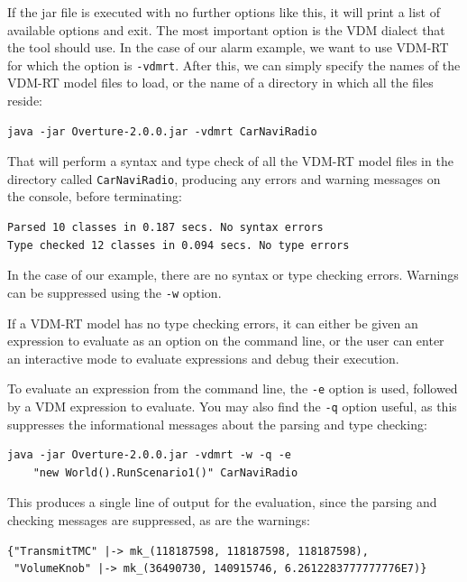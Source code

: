 \noindent If the jar file is executed with no further options like this, it will
print a list of available options and exit. The most important option is the VDM
dialect that the tool should use. In the case of our alarm example, we want to
use VDM-RT for which the option is \verb|-vdmrt|. After this, we can simply
specify the names of the VDM-RT model files to load, or the name of a directory
in which all the files reside:

\begin{lstlisting}
java -jar Overture-2.0.0.jar -vdmrt CarNaviRadio
\end{lstlisting}

\noindent That will perform a syntax and type check of all the VDM-RT model
files in the directory called \verb|CarNaviRadio|, producing any errors and warning
messages on the console, before terminating:

\begin{lstlisting}
Parsed 10 classes in 0.187 secs. No syntax errors
Type checked 12 classes in 0.094 secs. No type errors
\end{lstlisting}

\noindent In the case of our example, there are no syntax or type checking
errors. Warnings can be suppressed using the \verb|-w| option.

If a VDM-RT model has no type checking errors, it can either be given an
expression to evaluate as an option on the command line, or the user can enter
an interactive mode to evaluate expressions and debug their execution.

To evaluate an expression from the command line, the \verb|-e| option is used,
followed by a VDM expression to evaluate. You may also find the \verb|-q|
option useful, as this suppresses the informational messages about the parsing
and type checking:

\begin{lstlisting}
java -jar Overture-2.0.0.jar -vdmrt -w -q -e 
    "new World().RunScenario1()" CarNaviRadio
\end{lstlisting}

\noindent This produces a single line of output for the evaluation, since the
parsing and checking messages are suppressed, as are the warnings:

\begin{lstlisting}
{"TransmitTMC" |-> mk_(118187598, 118187598, 118187598), 
 "VolumeKnob" |-> mk_(36490730, 140915746, 6.2612283777777776E7)}
\end{lstlisting}

